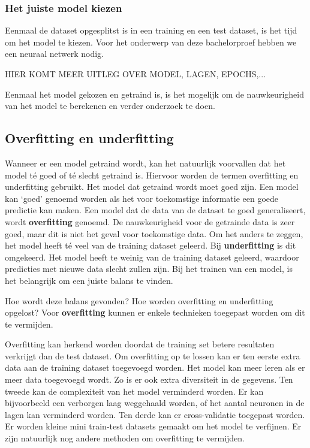 \subsubsection{Het juiste model kiezen}
\label{sec:model}
Eenmaal de dataset opgesplitst is in een training en een test dataset, is het tijd om het model te kiezen. Voor het onderwerp van deze bachelorproef hebben we een neuraal netwerk nodig.

HIER KOMT MEER UITLEG OVER MODEL, LAGEN, EPOCHS,... 

Eenmaal het model gekozen en getraind is, is het mogelijk om de nauwkeurigheid van het model te berekenen en verder onderzoek te doen. 

\subsection{Overfitting en underfitting}
\label{sec:overunderfitting}

Wanneer er een model getraind wordt, kan het natuurlijk voorvallen dat het model té goed of té slecht getraind is. Hiervoor worden de termen overfitting en underfitting gebruikt. Het model dat getraind wordt moet goed zijn. Een model kan ‘goed’ genoemd worden als het voor toekomstige informatie een goede predictie kan maken. Een model dat de data van de dataset te goed generaliseert, wordt \textbf{overfitting} genoemd. De nauwkeurigheid voor de getrainde data is zeer goed, maar dit is niet het geval voor toekomstige data. Om het anders te zeggen, het model heeft té veel van de training dataset geleerd. Bij \textbf{underfitting} is dit omgekeerd. Het model heeft te weinig van de training dataset geleerd, waardoor predicties met nieuwe data slecht zullen zijn. Bij het trainen van een model, is het belangrijk om een juiste balans te vinden. \autocite{AlMasri2019}

Hoe wordt deze balans gevonden? Hoe worden overfitting en underfitting opgelost? 
Voor \textbf{overfitting} kunnen er enkele technieken toegepast worden om dit te vermijden. 

Overfitting kan herkend worden doordat de training set betere resultaten verkrijgt dan de test dataset. Om overfitting op te lossen kan er ten eerste extra data aan de training dataset toegevoegd worden. Het model kan meer leren als er meer data toegevoegd wordt. Zo is er ook extra diversiteit in de gegevens. Ten tweede kan de complexiteit van het model verminderd worden. Er kan bijvoorbeeld een verborgen laag weggehaald worden, of het aantal neuronen in de lagen kan verminderd worden. Ten derde kan er cross-validatie toegepast worden. Er worden kleine mini train-test datasets gemaakt om het model te verfijnen. Er zijn natuurlijk nog andere methoden om overfitting te vermijden. \autocite{Datascience2021}

